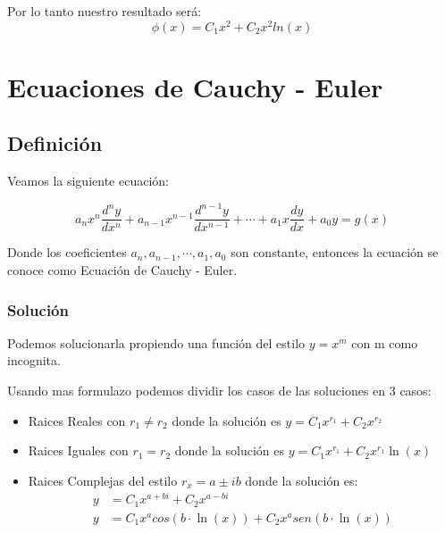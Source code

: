 \documentclass[12pt]{report}                                %
\begin{document}
        Por lo tanto nuestro resultado será:
        \begin{equation*}
            \phi(x) = C_1 x^2 + C_2 x^2 ln(x)
        \end{equation*}


\chapter{Ecuaciones de Cauchy - Euler}
    \clearpage

    \section{Definición}

        Veamos la siguiente ecuación:

        \begin{equation}
            a_n x^n \frac{d^n y}{dx^n} + a_{n-1} x^{n-1} \frac{d^{n-1} y}{dx^{n-1}} + \cdots + a_1 x \frac{dy}{dx} + a_0 y = g(x)
        \end{equation}

        Donde los coeficientes $a_n, a_{n-1}, \cdots , a_1, a_0$ son constante, entonces la ecuación se conoce como Ecuación de Cauchy - Euler.

        \subsection{Solución}
        Podemos solucionarla propiendo una función del estilo $y = x^m$ con m como incognita.

        Usando mas formulazo podemos dividir los casos de las soluciones en 3 casos:

        \begin{itemize}
            \item Raices Reales con $r_1 \neq r_2$ donde la solución es $ y = C_1 x ^{r_1} + C_2 x^{r_2}$ 
            \item Raices Iguales con $r_1 = r_2$ donde la solución es $ y = C_1 x ^{r_1} + C_2 x^{r_1} \ln(x)$ 
            \item Raices Complejas del estilo $r_x  = a \pm ib$ donde la solución es:\\
            \begin{equation*}
            \begin{split}
                y &= C_1 x^{a+bi} + C_2 x^{a-bi}\\
                y &= C_1 x^a cos(b \cdot \ln(x)) + C_2 x^a sen(b \cdot \ln(x))
            \end{split}
            \end{equation*}
        \end{itemize}
\end{document}
